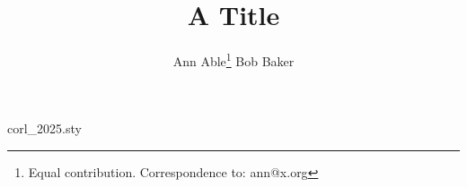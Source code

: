\begin{filecontents*}[overwrite]{corl_2025.sty}
\providecommand{\maketitle}{}
\renewcommand{\maketitle}{%
  \par
  \begingroup
    \renewcommand{\thefootnote}{\fnsymbol{footnote}}
    \renewcommand{\@makefnmark}{\hbox to \z@{$^{\@thefnmark}$\hss}}
    \@maketitle
    \@thanks
  \endgroup
  \let\maketitle\relax
  \let\thanks\relax
}
\renewcommand{\@maketitle}{\vbox{\hsize\textwidth\centering{\LARGE\bf \@title\par}
  \def\And{\end{tabular}\hfil\linebreak[0]\hfil\begin{tabular}[t]{c}\bf\ignorespaces}%
  \begin{tabular}[t]{c}\bf\@author\end{tabular}}}
\end{filecontents*}
\documentclass{article}
\usepackage{corl_2025}
\title{A Title}
\author{Ann Able\thanks{Equal contribution. Correspondence to: ann@x.org} \And Bob Baker\footnotemark[1]}

\maketitle
Body.

